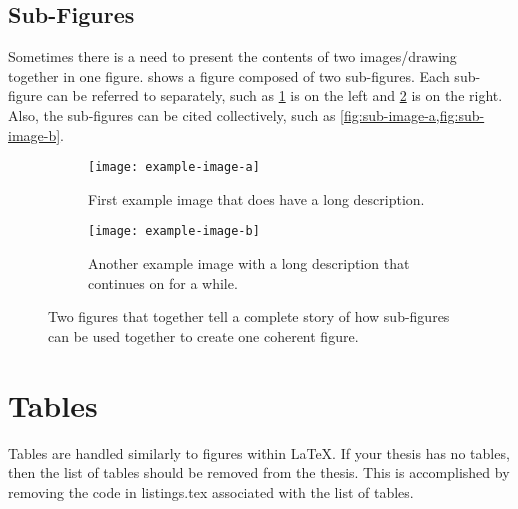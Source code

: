 \subsection{Sub-Figures}
    Sometimes there is a need to present the contents of two images/drawing together in one figure.
     shows a figure composed of two sub-figures.
    Each sub-figure can be referred to separately, such as \cref{fig:sub-image-a} is on the left and \cref{fig:sub-image-b} is on the right.
    Also, the sub-figures can be cited collectively, such as \cref{fig:sub-image-a,fig:sub-image-b}.
    \begin{figure}
        \centering
        \begin{subfigure}[t]{2.5in}
            \texttt{[image: example-image-a]}
            \caption{First example image that does have a long description.}
            \label{fig:sub-image-a}
        \end{subfigure}
        \hspace{0.2in}
        \begin{subfigure}[t]{2.5in}
            \texttt{[image: example-image-b]}
            \caption[size=normal]{Another example image with a long description that continues on for a while.}
            \label{fig:sub-image-b}
        \end{subfigure}
        \caption{Two figures that together tell a complete story of how sub-figures can be used together to create one coherent figure.}
        \label{fig:subfig-example}
    \end{figure}

\section{Tables} \label{sec:Tables}
    Tables are handled similarly to figures within \LaTeX.
    If your thesis has no tables, then the list of tables should be removed from the thesis.
    This is accomplished by removing the code in listings.tex associated with the list of tables.

